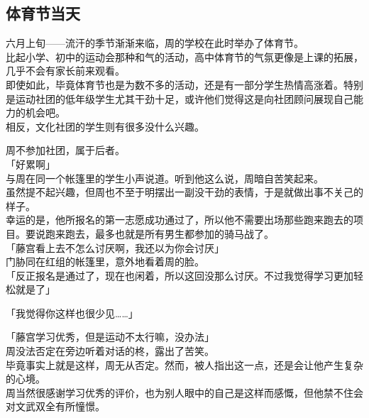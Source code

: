 \subsection{体育节当天}

六月上旬——流汗的季节渐渐来临，周的学校在此时举办了体育节。\\

比起小学、初中的运动会那种和气的活动，高中体育节的气氛更像是上课的拓展，几乎不会有家长前来观看。\\

即使如此，毕竟体育节也是为数不多的活动，还是有一部分学生热情高涨着。特别是运动社团的低年级学生尤其干劲十足，或许他们觉得这是向社团顾问展现自己能力的机会吧。\\

相反，文化社团的学生则有很多没什么兴趣。

周不参加社团，属于后者。\\

「好累啊」\\

与周在同一个帐篷里的学生小声说道。听到他这么说，周暗自苦笑起来。\\

虽然提不起兴趣，但周也不至于明摆出一副没干劲的表情，于是就做出事不关己的样子。\\

幸运的是，他所报名的第一志愿成功通过了，所以他不需要出场那些跑来跑去的项目。要说跑来跑去，最多也就是所有男生都参加的骑马战了。\\

「藤宫看上去不怎么讨厌啊，我还以为你会讨厌」\\

门胁同在红组的帐篷里，意外地看着周的脸。\\

「反正报名是通过了，现在也闲着，所以这回没那么讨厌。不过我觉得学习更加轻松就是了」

「我觉得你这样也很少见……」

「藤宫学习优秀，但是运动不太行嘛，没办法」\\

周没法否定在旁边听着对话的柊，露出了苦笑。\\

毕竟事实上就是这样，周无从否定。然而，被人指出这一点，还是会让他产生复杂的心境。\\

周当然很感谢学习优秀的评价，也为别人眼中的自己是这样而感慨，但他禁不住会对文武双全有所憧憬。\\


